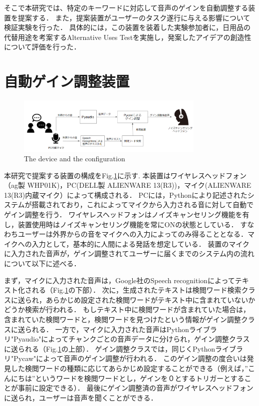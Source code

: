 \documentclass[a4paper]{jarticle}
\begin{document}
そこで本研究では、特定のキーワードに対応して音声のゲインを自動調整する装置を提案する．
また，提案装置がユーザーのタスク遂行に与える影響について検証実験を行った．
具体的には，この装置を装着した実験参加者に，日用品の代替用途を考案するAlternative Uses Test\cite{AUT}を実施し，発案したアイデアの創造性について評価を行った．
%
\section{自動ゲイン調整装置}
\begin{figure}[htbp]
    \begin{center}
    \includegraphics[width=90mm]{system.PNG}
    \caption{The device and the configuration}
    \label{fig:system}
    \end{center}
    \end{figure}

本研究で提案する装置の構成をFig.\ref{fig:system}に示す.
本装置はワイヤレスヘッドフォン（ag製 WHP01K)，PC(DELL製 ALIENWARE 13(R3))，マイク(ALIENWARE 13(R3)内蔵マイク）によって構成される．
PCには，Pythonにより記述されたシステムが搭載されており，これによってマイクから入力される音に対して自動でゲイン調整を行う．
ワイヤレスヘッドフォンはノイズキャンセリング機能を有し，装置使用時はノイズキャンセリング機能を常にONの状態としている．
すなわちユーザーは外界からの音をマイクへの入力によってのみ得ることとなる．マイクへの入力として，基本的に人間による発話を想定している．
装置のマイクに入力された音声が，ゲイン調整されてユーザーに届くまでのシステム内の流れについて以下に述べる．

まず，マイクに入力された音声は，Google社のSpeech recognitionによってテキスト化される（Fig.\ref{fig:system}の下部）．
次に，生成されたテキストは検閲ワード検索クラスに送られ，あらかじめ設定された検閲ワードがテキスト中に含まれていないかどうか検索が行われる．
もしテキスト中に検閲ワードが含まれていた場合は，含まれていた検閲ワードと，検閲ワードを見つけたという情報がゲイン調整クラスに送られる．
一方で，マイクに入力された音声はPythonライブラリ"Pyaudio"によってチャンクごとの音声データに分けられ，ゲイン調整クラスに送られる（Fig.\ref{fig:system}の上部）．
ゲイン調整クラスでは，同じくPythonライブラリ"Pycaw"によって音声のゲイン調整が行われる．
このゲイン調整の度合いは発見した検閲ワードの種類に応じてあらかじめ設定することができる（例えば，”こんにちは”というワードを検閲ワードとし，ゲインを０とするトリガーとすることが事前に設定できる）．
最後にゲイン調整済の音声がワイヤレスヘッドフォンに送られ，ユーザーは音声を聞くことができる．
\end{document}
